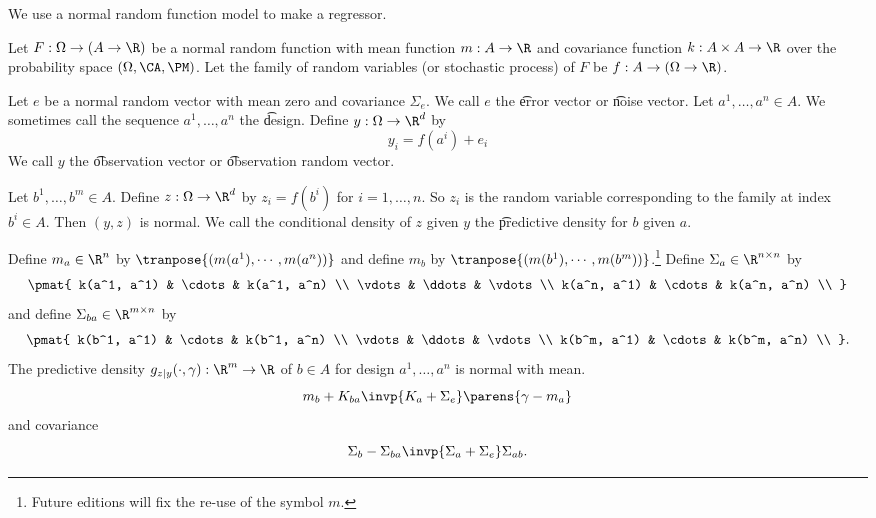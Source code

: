 

We use a normal random function model to make a regressor.


Let $F: \Omega \to (A \to \R)$ be a normal random function with mean function $m: A \to \R$ and covariance function $k: A \times A \to \R$ over the probability space $(\Omega, \CA, \PM)$.
Let the family of random variables (or stochastic process) of $F$ be $f: A \to (\Omega \to \R)$.

Let $e$ be a normal random vector with mean zero and covariance $\Sigma_{e}$.
We call $e$ the \t{error vector} or \t{noise vector}.
Let $a^1, \dots, a^n \in A$.
We sometimes call the sequence $a^1, \dots, a^n$ the \t{design}.
Define $y: \Omega \to \R^d$ by
\[
  y_i = f(a^i) + e_i
\]
We call $y$ the \t{observation vector} or \t{observation random vector}.

Let $b^1, \dots, b^m \in A$.
Define $z: \Omega \to \R^d$ by $z_i = f(b^i)$ for $i = 1, \dots, n$.
So $z_i$ is the random variable corresponding to the family at index $b^i \in A$.
Then $(y, z)$ is normal.
We call the conditional density of $z$ given $y$ the \t{predictive density} for $b$ given $a$.

\begin{proposition}
  Define $m_{a} \in \R^{n}$ by $\tranpose{(m(a^1),\cdots,m(a^n))}$ and define $m_{b}$ by $\tranpose{(m(b^1), \cdots, m(b^m))}$.\footnote{Future editions will fix the re-use of the symbol $m$.}
  Define $\Sigma_a \in \R^{n \times n}$ by
  \[
    \pmat{
      k(a^1, a^1) & \cdots & k(a^1, a^n) \\
      \vdots & \ddots & \vdots \\
      k(a^n, a^1) & \cdots & k(a^n, a^n) \\
    }
  \]
  and define $\Sigma_{ba} \in \R^{m \times n}$ by
  \[
    \pmat{
      k(b^1, a^1) & \cdots & k(b^1, a^n) \\
      \vdots & \ddots & \vdots \\
      k(b^m, a^1) & \cdots & k(b^m, a^n) \\
    }.
  \]
  The predictive density $g_{z \mid y}(\cdot, \gamma): \R^m \to \R$ of $b \in A$ for design $a^1, \dots, a^n$ is normal with mean.
  \[
    m_b  + K_{ba}\invp{K_{a} + \Sigma_{e}}\parens{\gamma - m_a}
  \]
  and covariance
  \[
    \Sigma_{b} - \Sigma_{ba}\invp{\Sigma_{a} + \Sigma_{e}}\Sigma_{ab}.
  \]
\end{proposition}

